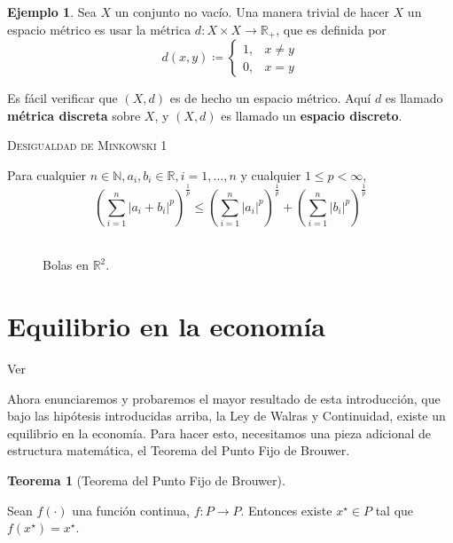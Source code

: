 \documentclass[10pt,a4paper]{article}
\theoremstyle{definition}
\newtheorem{theorem}{Teorema}[section]
\newtheorem{example}{Ejemplo}
\newcommand{\brouwer}{Teorema del Punto Fijo de Brouwer}
\newcommand{\walras}{Ley de Walras y Continuidad}
\begin{document}
\begin{example}

Sea $X$ un conjunto no vacío. Una manera trivial de hacer $X$ un espacio métrico es usar la métrica $d:X\times X\rightarrow\mathbb{R}_+$, que es definida por
$$
d(x,y)\coloneqq\begin{cases}
1,&x\neq y\\
0,& x=y
\end{cases}
$$

Es fácil verificar que $(X,d)$ es de hecho un espacio métrico. Aquí $d$ es llamado \textbf{métrica discreta} sobre $X$, y $(X,d)$ es llamado un \textbf{espacio discreto}.
\end{example}

\clearpage
\setcounter{page}{2}

\begin{mdframed}[style=minkowski]
	\vspace*{3mm}
	\color{Violet}
	\textsc{Desigualdad de Minkowski 1}
	
	\noindent
	Para cualquier $n\in\mathbb{N}, a_i, b_i\in\mathbb{R}, i=1,\ldots,n$ y cualquier $1\leq p<\infty$,
	\
	$$
	{\left(\sum_{i=1}^{n}{\left\lvert a_i+b_i\right\rvert}^{p}\right)}^{\frac{1}{p}}\leq
	{\left(\sum_{i=1}^{n}{\left\lvert a_i\right\rvert}^{p}\right)}^{\frac{1}{p}}+
	{\left(\sum_{i=1}^{n}{\left\lvert b_i\right\rvert}^{p}\right)}^{\frac{1}{p}}
	$$
	\
\end{mdframed}

\begin{figure}[H]
	\centering
	\scalebox{.5}{}
	\caption{Bolas en $\mathbb{R}^2$.}
\end{figure}

\section[Equilibrio]{Equilibrio en la economía}

Ver \cite[Capítulo 5]{Starr2011}

{
\sffamily\LARGE
Ahora enunciaremos y probaremos el mayor resultado de esta introducción, que bajo las hipótesis introducidas arriba, la \walras, existe un equilibrio en la economía. Para hacer esto, necesitamos una pieza adicional de estructura matemática, el \brouwer.
}

\begin{theorem}[\brouwer]\label{eq:brouwer}

Sean $f(\cdot)$ una función continua, $f:P\rightarrow P$. Entonces existe $x^{\star}\in P$ tal que $f(x^{\star})=x^{\star}$.

\end{theorem}
\end{document}
